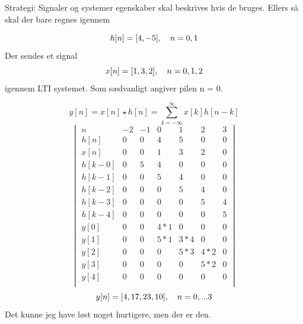 \begin{EksamensOpgaver}
    \begin{Eksamenssæt}[2021]
        Strategi:
        Signaler og systemer egenskaber skal beskrives hvis de bruges.
        Ellers så skal der bare regnes igennem
        \begin{eksamensOpgave}
            \[h[n] = [4, -5], \tab{0} n = 0, 1\]
            Der sendes et signal 
            \[x[n] = [1, 3, 2], \tab{0} n = 0, 1, 2\]
            igennem LTI systemet. Som sædvanligt angiver pilen n = 0.
            \begin{UnderOpgave}[Beregn \text{$y[n] = x[n] \star h[n]$} med "papir og blyant, hvis mellemregninger]
                \[y[n] = x[n] \star h[n] = \sum_{k = - \infty}^{\infty}{x[k]h[n - k]}\]
                \[\begin{vmatrix}%
                    n        & -2 & -1 & 0   & 1   & 2   & 3 \\
                    h[n]     &  0 &  0 & 4   & 5   & 0   & 0 \\
                    x[n]     &  0 &  0 & 1   & 3   & 2   & 0 \\
                    \hline
                    h[k - 0] &  0 &  5 & 4   & 0   & 0   & 0 \\
                    h[k - 1] &  0 &  0 & 5   & 4   & 0   & 0 \\
                    h[k - 2] &  0 &  0 & 0   & 5   & 4   & 0 \\
                    h[k - 3] &  0 &  0 & 0   & 0   & 5   & 4 \\
                    h[k - 4] &  0 &  0 & 0   & 0   & 0   & 5 \\
                    \hline
                    y[0]     &  0 &  0 & 4*1 & 0   & 0   & 0 \\
                    y[1]     &  0 &  0 & 5*1 & 3*4 & 0   & 0 \\  
                    y[2]     &  0 &  0 & 0   & 5*3 & 4*2 & 0 \\
                    y[3]     &  0 &  0 & 0   & 0   & 5*2 & 0 \\
                    y[4]     &  0 &  0 & 0   & 0   & 0   & 0 \\
                \end{vmatrix}\]
                \[y[n] = [4, 17, 23, 10], \tab{0} n = 0, ... 3\]
                Det kunne jeg have løst noget hurtigere, men der er den. 
            \end{UnderOpgave}

\end{eksamensOpgave}
\end{Eksamenssæt}
\end{EksamensOpgaver}
